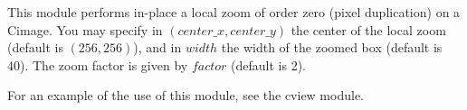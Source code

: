 This module performs in-place a local zoom of order zero 
(pixel duplication) on a Cimage.
You may specify in $(center\_x,center\_y)$ 
the center of the local zoom (default
is $(256,256)$), and in $width$ the width of the zoomed box (default is 40).
The zoom factor is given by $factor$ (default is 2).

For an example of the use of this module, see the cview module.

